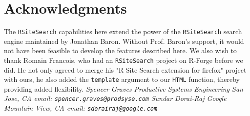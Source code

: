 \section*{Acknowledgments}
The {\tt RSiteSearch} capabilities here extend the power of the
{\tt RSiteSearch} search engine maintained by Jonathan Baron.
Without Prof. Baron's support, it would not have been feasible
to develop the features described here.  We also wish to thank
Romain Francois, who had an {\tt RSiteSearch} project on R-Forge
before we did.  He not only agreed to merge his "R Site Search
extension for firefox" project with ours, he also added the
{\tt template} argument to our {\tt HTML} function, thereby
providing added flexibility.
\newline \newline
\emph{Spencer Graves \newline
Productive Systems Engineering \newline
San Jose, CA \newline
email:  {\tt spencer.graves@prodsyse.com} }
\newline \newline
\emph{Sundar Dorai-Raj \newline
Google \newline 
Mountain View, CA \newline 
email:  {\tt sdorairaj@google.com} }

